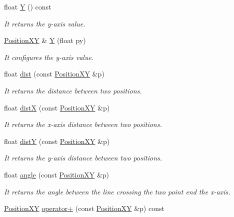 \begin{DoxyCompactItemize}
float \hyperlink{class_position_x_y_aa6bceb45b13566b4a312d5d7aad2ec77}{Y} () const 
\begin{DoxyCompactList}\small\item\em It returns the y-\/axis value. \end{DoxyCompactList}\item 
\hyperlink{class_position_x_y}{Position\+X\+Y} \& \hyperlink{class_position_x_y_a7bb12f86083750580799fcf0535518e9}{Y} (float py)
\begin{DoxyCompactList}\small\item\em It configures the y-\/axis value. \end{DoxyCompactList}\item 
float \hyperlink{class_position_x_y_a2e68cceafbc6d1a9d2956e64efbca1bf}{dist} (const \hyperlink{class_position_x_y}{Position\+X\+Y} \&p)
\begin{DoxyCompactList}\small\item\em It returns the distance between two positions. \end{DoxyCompactList}\item 
float \hyperlink{class_position_x_y_a781dce14528b62570fc4eed6318bab52}{dist\+X} (const \hyperlink{class_position_x_y}{Position\+X\+Y} \&p)
\begin{DoxyCompactList}\small\item\em It returns the x-\/axis distance between two positions. \end{DoxyCompactList}\item 
float \hyperlink{class_position_x_y_a099d374de2c2547108cbeba0cd6f89e2}{dist\+Y} (const \hyperlink{class_position_x_y}{Position\+X\+Y} \&p)
\begin{DoxyCompactList}\small\item\em It returns the y-\/axis distance between two positions. \end{DoxyCompactList}\item 
float \hyperlink{class_position_x_y_ab3a2559edfce2a9c6eb4ddc6ce456776}{angle} (const \hyperlink{class_position_x_y}{Position\+X\+Y} \&p)
\begin{DoxyCompactList}\small\item\em It returns the angle between the line crossing the two point end the x-\/axis. \end{DoxyCompactList}\item 
\hyperlink{class_position_x_y}{Position\+X\+Y} \hyperlink{class_position_x_y_a8488dcd6f61a8019e6f3c6d147cf35c5}{operator+} (const \hyperlink{class_position_x_y}{Position\+X\+Y} \&p) const 

\end{DoxyCompactItemize}
